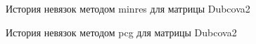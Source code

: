 \begin{figure}[H]
    \renewcommand{\figurename}{Рисунок}
    \caption{История невязок методом minres для матрицы Dubcova2}
    \label{fig:image_7}
\end{figure}

\begin{figure}[H]
    \renewcommand{\figurename}{Рисунок}
    \caption{История невязок методом pcg для матрицы Dubcova2}
    \label{fig:image_8}
\end{figure}

